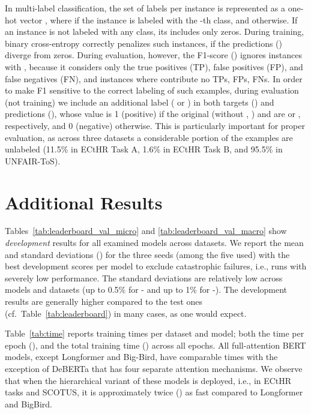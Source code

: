 \documentclass[11pt]{article}
\newcommand{\macrof}{-\xspace}
\newcommand{\microf}{-\xspace}
\begin{document}
In multi-label classification, the set of labels per instance is represented as a one-hot vector , where  if the instance is labeled with the -th class, and  otherwise. If an instance is not labeled with any class, its  includes only zeros. During training, binary cross-entropy correctly penalizes such instances, if the predictions () diverge from zeros. During evaluation, however, the F1-score () ignores  instances with , because it considers only the true positives (\textrm{TP}), false positives (\textrm{FP}), and false negatives (\textrm{FN}), and instances where  contribute no \textrm{TP}s, \textrm{FP}s, \textrm{FN}s.
In order to make F1 sensitive to the correct labeling of such examples, during evaluation (not training) we include an additional label ( or ) in both targets () and predictions (), whose value is 1 (positive) if the original (without , )  and  are  or , respectively, and 0 (negative) otherwise. This is particularly important for proper evaluation, as across three datasets a considerable portion of the examples are unlabeled (11.5\% in ECtHR Task A,  1.6\% in ECtHR Task B, and 95.5\% in UNFAIR-ToS).

\section{Additional Results}
\label{sec:additional}

Tables~\ref{tab:leaderboard_val_micro} and \ref{tab:leaderboard_val_macro} show \emph{development} results for all examined models across datasets. We  report the mean and standard deviations () for the three seeds (among the five used) with the best development scores per model to exclude catastrophic failures, i.e., runs with severely low performance. The standard deviations are relatively low across models and datasets (up to 0.5\% for \microf and up to 1\% for \macrof).
The development results are generally higher compared to the test ones (cf.\ Table~\ref{tab:leaderboard}) in many cases, as one would expect. 

Table~\ref{tab:time} reports training times per dataset and model; both the time per epoch (), and the total training time () across all epochs. All full-attention BERT models, except Longformer and Big-Bird, have comparable times with the exception of DeBERTa that has four separate attention mechanisms. We observe that when the hierarchical variant of these models is deployed, i.e., in ECtHR tasks and SCOTUS, it is approximately twice () as fast compared to Longformer and BigBird.
\end{document}
